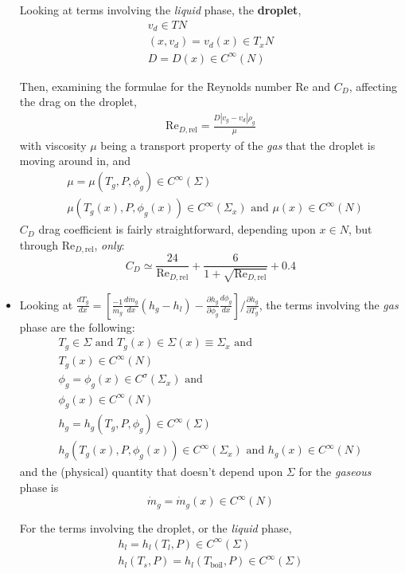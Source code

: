 \documentclass[10pt]{amsart}
\begin{document}
\begin{multicols*}{2}
\begin{itemize}
Looking at terms involving the \emph{liquid} phase, the \textbf{droplet},
\[
\begin{gathered}
  v_d \in TN \\
  (x,v_d) = v_d(x) \in T_xN \\
  D=D(x) \in C^{\infty}(N)
\end{gathered}
\]

Then, examining the formulae for the Reynolds number $\text{Re}$ and $C_D$, affecting the drag on the droplet, 
\[
\begin{gathered}
  \text{Re}_{D,\text{rel}} = \frac{ D|v_g-v_d| \rho_g }{\mu}
\end{gathered}
\]
with viscosity $\mu$ being a transport property of the \emph{gas} that the droplet is moving around in, and
\[
\begin{aligned}
  & \mu = \mu(T_g,P,\phi_g) \in C^{\infty}(\Sigma) \\ 
  & \mu(T_g(x),P,\phi_g(x)) \in C^{\infty}(\Sigma_x) \text{ and } \mu(x) \in C^{\infty}(N)
\end{aligned}
\]
$C_D$ drag coefficient is fairly straightforward, depending upon $x\in N$, but through $\text{Re}_{D,\text{rel}}$, \emph{only}:
\[
C_D \simeq \frac{24}{ \text{Re}_{D,\text{rel}} } + \frac{ 6 }{ 1 + \sqrt{ \text{Re}_{D,\text{rel}} } } + 0.4
\]

\item Looking at $\frac{dT_g}{dx} = \left[ \frac{-1}{\dot{m}_g} \frac{d\dot{m}_g}{dx} (h_g-h_l) - \frac{\partial h_g}{\partial \phi_g} \frac{ d\phi_g}{dx} \right]/ \frac{ \partial h_g}{\partial T_g}$, the terms involving the \emph{gas} phase are the following:
\[
\begin{gathered}
  T_g \in \Sigma \text{ and } T_g(x) \in \Sigma(x) \equiv \Sigma_x \text{ and } \\
  T_g(x) \in C^{\infty}(N) \\
  \phi_g = \phi_g(x) \in C^{\sigma}(\Sigma_x) \text{ and } \\
  \phi_g(x) \in C^{\infty}(N) \\ 
  h_g = h_g(T_g,P,\phi_g) \in C^{\infty}(\Sigma) \\ 
  h_g(T_g(x),P,\phi_g(x)) \in C^{\infty}(\Sigma_x) \text{ and } h_g(x) \in C^{\infty}(N) 
\end{gathered}
\]
and the (physical) quantity that doesn't depend upon $\Sigma$ for the \emph{gaseous} phase is
\[
\dot{m}_g = \dot{m}_g(x) \in C^{\infty}(N)
\]

For the terms involving the droplet, or the \emph{liquid} phase,
\[
\begin{gathered}
  h_l = h_l(T_l,P) \in C^{\infty}(\Sigma) \\
  h_l(T_s,P) = h_l(T_{\text{boil}},P) \in C^{\infty}(\Sigma)
\end{gathered}
\]


\end{itemize}
\end{multicols*}
\end{document}
